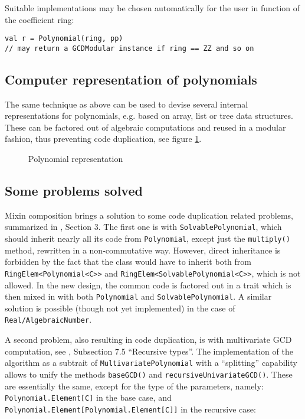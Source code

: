 \documentclass{llncs}
\newcommand{\code}[1]{\texttt{#1}}
\begin{document}
Suitable implementations may be chosen automatically for the user in function
of the coefficient ring:

\begin{verbatim}
val r = Polynomial(ring, pp)
// may return a GCDModular instance if ring == ZZ and so on
\end{verbatim}

\subsection{Computer representation of polynomials} %

The same technique as above can be used to devise several internal
representations for polynomials, e.g. based on array, list or tree data
structures. These can be factored out of algebraic computations and reused
in a modular fashion, thus preventing code duplication, see figure
\ref{fig:poly}.

\begin{figure}[thb]
\centering
{}
\caption{Polynomial representation}
\label{fig:poly}
\end{figure}

\subsection{Some problems solved} %

Mixin composition brings a solution to some code duplication related problems,
summarized in \cite{JollyKredel:2011}, Section 3. The first one is with
\code{SolvablePolynomial}, which should inherit nearly all its code from
\code{Polynomial}, except just the \code{multiply()} method, rewritten in a
non-commutative way. However, direct inheritance is forbidden by the fact that
the class would have to inherit both from \code{RingElem\-<Polynomial<C>>} and
\code{RingElem<SolvablePolynomial<C>>}, which is not allowed. In the new design,
the common code is factored out in a trait which is then mixed in with both
\code{Polynomial} and \code{SolvablePolynomial}. A similar solution is possible
(though not yet implemented) in the case of \code{Real/AlgebraicNumber}.

A second problem, also resulting in code duplication, is with multivariate
GCD computation, see \cite{Kredel:2008}, Subsection 7.5 ``Recursive types''.
The implementation of the algorithm as a subtrait of
\code{MultivariatePolynomial} with a ``splitting'' capability allows to
unify the methods \code{baseGCD()} and \code{recursive\-UnivariateGCD()}. These
are essentially the same, except for the type of the parameters, namely:
\code{Polynomial.Element[C]} in the base case, and
\code{Polynomial\-.Element[Polynomial.Element[C]]} in the recursive case:
\end{document}
